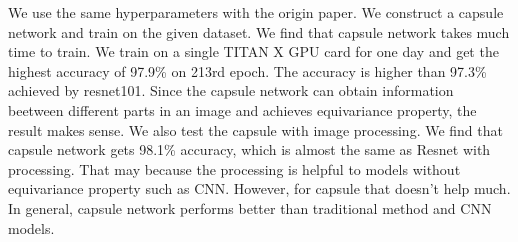 \documentclass{article}
\begin{document}
We use the same hyperparameters with the origin paper. We construct a capsule network and train on the given dataset. We find that capsule network takes much time to train. We train on a single TITAN X GPU card for one day and get the highest accuracy of 97.9\% on 213rd epoch. The accuracy is higher than 97.3\% achieved by resnet101. Since the capsule network can obtain  information beetween different parts in an image and achieves equivariance property, the result makes sense. We also test the capsule with image processing. We find that capsule network gets 98.1\% accuracy, which is almost the same as Resnet with processing. That may because the processing is helpful to models without equivariance property such as CNN. However, for capsule that doesn't help much. In general, capsule network performs better than traditional method and CNN models.






\end{document}
